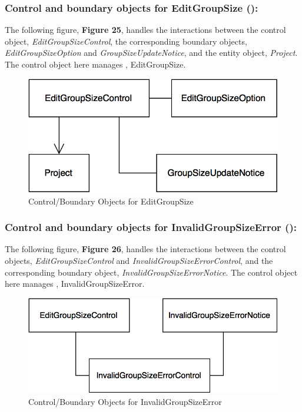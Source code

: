\documentclass[12pt,letterpaper]{article}
\begin{document}
\newpage{}

\subsubsection*{Control and boundary objects for EditGroupSize (\editgroupsize{}):}

The following figure, {\bf Figure 25}, handles the interactions between the control object, {\it EditGroupSizeControl}, the corresponding boundary objects, 
{\it EditGroupSizeOption} and {\it GroupSizeUpdateNotice}, and the entity object, {\it Project}. The control object here manages \editgroupsize{}, EditGroupSize.

\begin{figure}[H]
	\centering{}
	\includegraphics[scale=0.37]{imgs/cbod/edit-group-size.png}
	\caption{Control/Boundary Objects for EditGroupSize}
\end{figure}

\subsubsection*{Control and boundary objects for InvalidGroupSizeError (\invalidgroupsizeerror{}):}

The following figure, {\bf Figure 26}, handles the interactions between the control objects, {\it EditGroupSizeControl} and {\it InvalidGroupSizeErrorControl}, and the corresponding boundary object, 
{\it InvalidGroupSizeErrorNotice}. The control object here manages \invalidgroupsizeerror{}, InvalidGroupSizeError.

\begin{figure}[H]
	\centering{}
	\includegraphics[scale=0.37]{imgs/cbod/invalid-group-size-error.png}
	\caption{Control/Boundary Objects for InvalidGroupSizeError}
\end{figure}
\end{document}

